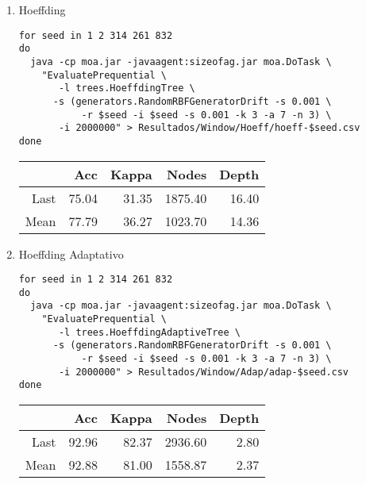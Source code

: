 \documentclass[11pt]{article}
\begin{document}
\begin{enumerate}
\item Hoeffding
\label{sec:orgd34ad4e}

\begin{verbatim}
for seed in 1 2 314 261 832
do
  java -cp moa.jar -javaagent:sizeofag.jar moa.DoTask \
    "EvaluatePrequential \
       -l trees.HoeffdingTree \
	  -s (generators.RandomRBFGeneratorDrift -s 0.001 \
	       -r $seed -i $seed -s 0.001 -k 3 -a 7 -n 3) \
       -i 2000000" > Resultados/Window/Hoeff/hoeff-$seed.csv
done
\end{verbatim}

\begin{table}[ht]
\centering
\begin{tabular}{rrrrr}
  \hline
 & Acc & Kappa & Nodes & Depth \\ 
  \hline
Last & 75.04 & 31.35 & 1875.40 & 16.40 \\ 
  Mean & 77.79 & 36.27 & 1023.70 & 14.36 \\ 
   \hline
\end{tabular}
\end{table}

\item Hoeffding Adaptativo
\label{sec:org5f24b72}

\begin{verbatim}
for seed in 1 2 314 261 832
do
  java -cp moa.jar -javaagent:sizeofag.jar moa.DoTask \
    "EvaluatePrequential \
       -l trees.HoeffdingAdaptiveTree \
	  -s (generators.RandomRBFGeneratorDrift -s 0.001 \
	       -r $seed -i $seed -s 0.001 -k 3 -a 7 -n 3) \
       -i 2000000" > Resultados/Window/Adap/adap-$seed.csv
done
\end{verbatim}

\begin{table}[ht]
\centering
\begin{tabular}{rrrrr}
  \hline
 & Acc & Kappa & Nodes & Depth \\ 
  \hline
Last & 92.96 & 82.37 & 2936.60 & 2.80 \\ 
  Mean & 92.88 & 81.00 & 1558.87 & 2.37 \\ 
   \hline
\end{tabular}
\end{table}
\end{enumerate}
\end{document}
